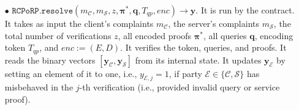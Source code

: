 \begin{definition}
\begin{itemize}

\


\item[$\bullet$] $\mathtt{RCPoRP}.\mathtt{resolve}(m_{\scriptscriptstyle \mathcal{C}},m_{\scriptscriptstyle \mathcal{S}},z, {\bm{\pi}}^{\scriptscriptstyle *}, {\bm{q}}, T_{\scriptscriptstyle qp},enc)\rightarrow \bm{y}$. It is run by the contract. It takes as input the client's complaints $m_{\scriptscriptstyle \mathcal{C}}$, the server's complaints $m_{\scriptscriptstyle \mathcal{S}}$, the total number of verifications $z$, all encoded proofs $ {\bm{\pi}}^{\scriptscriptstyle *}$, all queries  $ {\bm{q}}$,   encoding token $T_{\scriptscriptstyle qp}$, and $enc:=(E,D)$. It verifies the token,  queries, and proofs.  It reads the  binary vectors $[\bm{y}_{\scriptscriptstyle \mathcal  C}, \bm{y}_{\scriptscriptstyle \mathcal  S}]$ from its internal state. It  updates $\bm{y}_{\scriptscriptstyle \mathcal E}$ by setting an element of it to one, i.e., $y_{\scriptscriptstyle \mathcal E,j}=1$, if party $\mathcal{E}\in\{\mathcal{C},\mathcal{S}\}$ has misbehaved in the $j$-th verification (i.e., provided invalid query or service proof).  







\end{itemize}
\end{definition}
